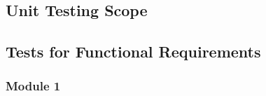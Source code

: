 \documentclass[12pt, titlepage]{article}
\begin{document}
\subsection{Unit Testing Scope}


\subsection{Tests for Functional Requirements}


\subsubsection{Module 1}




					
					
					


					
\end{document}
